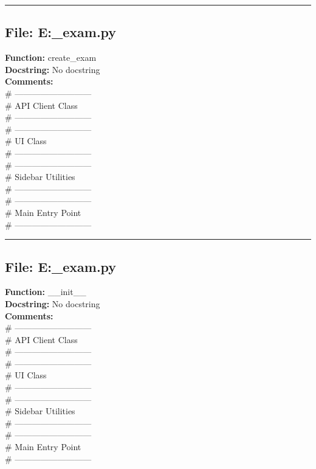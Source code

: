 {\hrule

\subsection*{File: E:\project\capstone\frontend\faculty\mst_exam.py}
\textbf{Function:} create_exam\\
\textbf{Docstring:} No docstring\\
\textbf{Comments:}\\
# ---------------------------\\
# API Client Class\\
# ---------------------------\\
# ---------------------------\\
# UI Class\\
# ---------------------------\\
# ---------------------------\\
# Sidebar Utilities\\
# ---------------------------\\
# ---------------------------\\
# Main Entry Point\\
# ---------------------------\\

\hrule

\subsection*{File: E:\project\capstone\frontend\faculty\mst_exam.py}
\textbf{Function:} __init__\\
\textbf{Docstring:} No docstring\\
\textbf{Comments:}\\
# ---------------------------\\
# API Client Class\\
# ---------------------------\\
# ---------------------------\\
# UI Class\\
# ---------------------------\\
# ---------------------------\\
# Sidebar Utilities\\
# ---------------------------\\
# ---------------------------\\
# Main Entry Point\\
# ---------------------------\\

}
